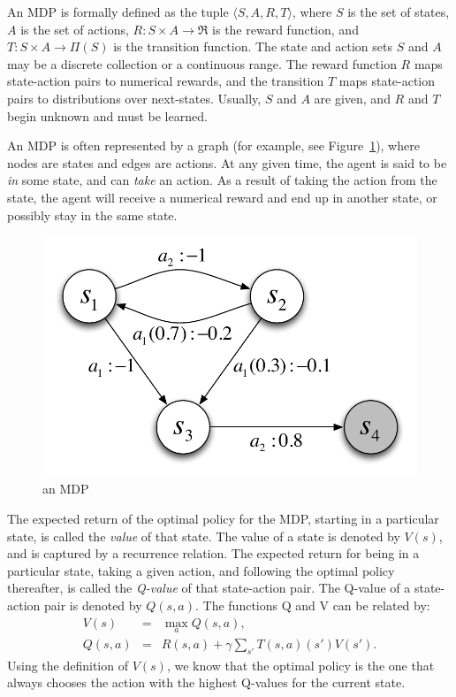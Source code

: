 An MDP is formally defined as the tuple $\langle S, A, R, T \rangle$, where $S$ is the set of states, $A$ is the set of actions, $R:S \times A \rightarrow \Re$ is the reward function, and $T:S \times A \rightarrow \Pi(S)$ is the transition function. The state and action sets $S$ and $A$ may be a discrete collection or a continuous range. The reward function $R$ maps state-action pairs to numerical rewards, and the transition $T$ maps state-action pairs to distributions over next-states. Usually, $S$ and $A$ are given, and $R$ and $T$ begin unknown and must be learned.

An MDP is often represented by a graph (for example, see Figure~\ref{intro:mdp}), where nodes are states and edges are actions. At any given time, the agent is said to be \emph{in} some state, and can \emph{take} an action. As a result of taking the action from the state, the agent will receive a numerical reward and end up in another state, or possibly stay in the same state.


\begin{figure}[t]
\begin{center}
\includegraphics[width=0.5\linewidth]{mdp.pdf}
\caption{an MDP}
\label{intro:mdp}
\end{center}
\end{figure}



The expected return of the optimal policy for the MDP, starting in a particular state, is called the \emph{value} of that state. The value of a state is denoted by $V(s)$, and is captured by a recurrence relation. The expected return for being in a particular state, taking a given action, and following the optimal policy thereafter, is called the \emph{Q-value} of that state-action pair. The Q-value of a state-action pair is denoted by $Q(s,a)$. The functions Q and V can be related by:
\begin{eqnarray}
\label{intro:eqn:value} V(s) &=& \max_a Q(s,a),\\
\label{intro:eqn:qvalue} Q(s,a) &=& R(s,a) + \gamma \sum_{s'} T(s,a)(s') V(s').
\end{eqnarray}
Using the definition of $V(s)$, we know that the optimal policy is the one that always chooses the action with the highest Q-values for the current state.

